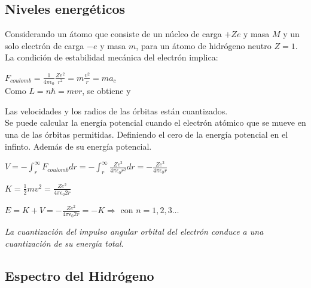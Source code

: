 \documentclass[oneside]{book}
\numberwithin{equation}{section}
\numberwithin{figure}{section}
\numberwithin{table}{section}
\begin{document}
			\subsection{Niveles energéticos}		
			
				Considerando un átomo que consiste de un núcleo de carga $+Ze$ y masa $M$ y un solo electrón de carga $-e$ y masa $m$, para un átomo de hidrógeno neutro $Z=1$. La condición de estabilidad mecánica del electrón implica:
				
				\begin{center}
					$\displaystyle F_{coulomb}=\frac{1}{4\pi \epsilon_0}\frac{Ze^2}{r^2}=m\frac{v^2}{r}=ma_c$\\		
			
					Como $L=n\hbar=mvr$, se obtiene  y 
				\end{center}
			
			Las velocidades y los radios de las órbitas están cuantizados.\\
			
			Se puede calcular la energía potencial cuando el electrón atómico que se mueve en una de las órbitas permitidas. Definiendo el cero de la energía potencial en el infinto. Además de su energía potencial.\\
			
			\begin{minipage}[t]{0.5\textwidth}
				$\displaystyle V=-\int_r^\infty F_{coulomb}dr=-\int_r^\infty \frac{Ze^2}{4\pi \epsilon_0 r^2}dr=-\frac{Ze^2}{4\pi \epsilon_0r}$
			\end{minipage}
			\begin{minipage}[t]{0.25\textwidth}
				$\displaystyle K=\frac{1}{2}mv^2=\frac{Ze^2}{4\pi \epsilon_0 2r}$
			\end{minipage}
			\begin{center}
				$\displaystyle E=K+V=-\frac{Ze^2}{4\pi \epsilon_0 2r}=-K \Rightarrow$ con $n=1,2,3 \ldots$
			\end{center}
			
				\textit{La cuantización del impulso angular orbital del electrón conduce a una cuantización de su energía total.}			
			
			\subsection{Espectro del Hidrógeno}	
			
\end{document}
